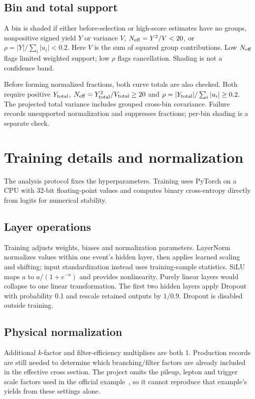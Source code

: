 \documentclass[11pt,a4paper]{article}
\begin{document}
\subsection{Bin and total support}\label{app:shape-support}
A bin is shaded if either before-selection or high-score estimates have no groups, nonpositive signed yield $Y$ or variance $V$, $N_{\rm eff}=Y^2/V<20$, or $\rho=|Y|/\sum_i|u_i|<0.2$.
Here $V$ is the sum of squared group contributions. Low $N_{\rm eff}$ flags limited weighted support; low $\rho$ flags cancellation. Shading is not a confidence band.

Before forming normalized fractions, both curve totals are also checked.
Both require positive $Y_{\rm total}$, $N_{\rm eff}=Y_{\rm total}^2/V_{\rm total}\geq20$ and $\rho=|Y_{\rm total}|/\sum_i|u_i|\geq0.2$.
The projected total variance includes grouped cross-bin covariance. Failure records unsupported normalization and suppresses fractions; per-bin shading is a separate check.

\section{Training details and normalization}\label{app:network}
The analysis protocol fixes the hyperparameters. Training uses PyTorch on a CPU with 32-bit floating-point values and computes binary cross-entropy directly from logits for numerical stability.

\subsection{Layer operations}\label{app:layers}
Training adjusts weights, biases and normalization parameters.
LayerNorm normalizes values within one event's hidden layer, then applies learned scaling and shifting; input standardization instead uses training-sample statistics.
SiLU maps $a$ to $a/(1+e^{-a})$ and provides nonlinearity. Purely linear layers would collapse to one linear transformation.
The first two hidden layers apply Dropout with probability 0.1 and rescale retained outputs by $1/0.9$. Dropout is disabled outside training.

\subsection{Physical normalization}\label{app:normalization}
Additional $k$-factor and filter-efficiency multipliers are both 1.
Production records are still needed to determine which branching/filter factors are already included in the effective cross section.
The project omits the pileup, lepton and trigger scale factors used in the official example~\cite{HZZAnalysis}, so it cannot reproduce that example's yields from these settings alone.
\end{document}
